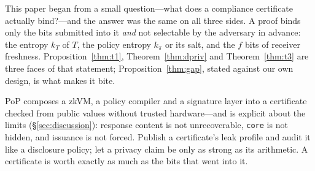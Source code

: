 \documentclass[10pt,journal,compsoc]{IEEEtran}
\begin{document}
This paper began from a small question---what does a compliance certificate
actually bind?---and the answer was the same on all three sides. A proof binds
only the bits submitted into it \emph{and} not selectable by the adversary in
advance: the entropy $k_T$ of $T$, the policy entropy $k_\pi$ or its salt, and
the $f$ bits of receiver freshness. Proposition~\ref{thm:t1},
Theorem~\ref{thm:dpriv} and Theorem~\ref{thm:t3} are three faces of that
statement; Proposition~\ref{thm:gap}, stated against our own design, is what
makes it bite.

PoP composes a zkVM, a policy compiler and a signature layer into a certificate
checked from public values without trusted hardware---and is explicit about the
limits (\S\ref{sec:discussion}): response content is not unrecoverable,
\texttt{core} is not hidden, and issuance is not forced. Publish a certificate's leak profile and audit it like a disclosure policy;
let a privacy claim be only as strong as its arithmetic. A
certificate is worth exactly as much as the bits that went into it.
\end{document}
